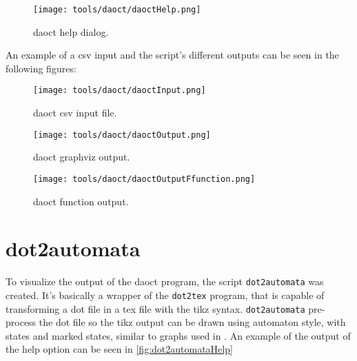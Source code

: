 \begin{figure}[H]
  \centering \texttt{[image: tools/daoct/daoctHelp.png]}
  \caption{daoct help dialog.}
  \label{fig:daoctHelp}
\end{figure}

An example of a csv input and the script's different outputs can
be seen in the following figures:
\vspace{-1cm}
\begin{figure}[H]
\begin{minipage}[H]{0.5\textwidth}
  \centering \texttt{[image: tools/daoct/daoctInput.png]}
  \caption{daoct csv input file.}
  \label{fig:daoctInput}
\end{minipage}
\begin{minipage}[H]{0.5\textwidth}
  \centering \texttt{[image: tools/daoct/daoctOutput.png]}
  \caption{daoct graphviz output.}
  \label{fig:daoctOutput}
\end{minipage}
\end{figure}  


\begin{figure}[H]
  \centering
  \texttt{[image: tools/daoct/daoctOutputFfunction.png]}
  \caption{daoct \ffunction{} function output.}
  \label{fig:daoctOutputFfunction}
\end{figure}

% 


% 

% 

\section{dot2automata}
\label{sec:dot2automata}

To visualize the output of the daoct program, the script \verb|dot2automata| was
created. It's basically a wrapper of the \verb|dot2tex| program, that is capable of
transforming a dot file in a tex file with the tikz syntax. \verb|dot2automata|
pre-process the dot file so the tikz output can be drawn using automaton style,
with states and marked states, similar to graphs used in \cite{moreira2018enhanced}.
An example of the output of the help option can be seen in \autoref{fig:dot2automataHelp}

